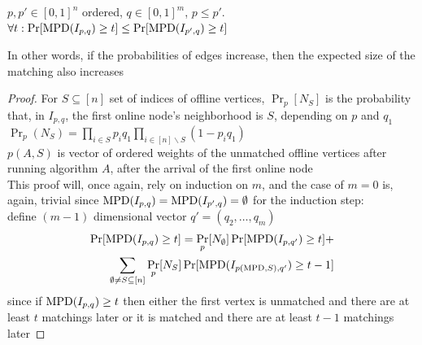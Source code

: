 \begin{lemma}
	\label{deg-lm2}
	$p,p'\in[0,1]^n$ ordered, $q\in[0,1]^m$, $p\leq p'$. \\
	$\forall t:\Pr[\mathrm{MPD}(I_{p,q})\geq t]\leq\Pr[\mathrm{MPD}(I_{p',q})\geq t]$
\end{lemma}
In other words, if the probabilities of edges increase, then the expected size of the matching also increases
\begin{proof}
	For $S\subseteq [n]$ set of indices of offline vertices, $\Pr_p[N_S]$ is the probability that, in $I_{p,q}$, the first online node's neighborhood is $S$, depending on $p$ and $q_1$\\
	$\Pr_p(N_S)=\prod\limits_{i\in S}p_iq_1\prod\limits_{i\in [n]\backslash S}(1-p_iq_1)$\\
	$p(A,S)$ is vector of ordered weights of the unmatched offline vertices after running algorithm $A$, after the arrival of the first online node\\
	This proof will, once again, rely on induction on $m$, and the case of $m=0$ is, again, trivial since $\mathrm{MPD}(I_{p,q})=\mathrm{MPD}(I_{p',q})=\emptyset$
	for the induction step:\\
	define $(m-1)$ dimensional vector $q'=(q_2,\dots,q_m)$
	\begin{equation}\begin{aligned}[b]
		\label{deg-eq1}
		\Pr[\mathrm{MPD}(I_{p,q})\geq t]=\Pr_p[N_{\emptyset}]\Pr[\mathrm{MPD}(I_{p,q'})\geq t]+\\ \sum\limits_{\emptyset\neq S\subseteq[n]}\Pr_p[N_S]\Pr[\mathrm{MPD}(I_{p(\mathrm{MPD},S),q'})\geq t-1]
	\end{aligned}\end{equation}
	since if $\mathrm{MPD}(I_{p,q})\geq t$ then either the first vertex is unmatched and there are at least $t$ matchings later or it is matched and there are at least $t-1$ matchings later
	

\end{proof}

